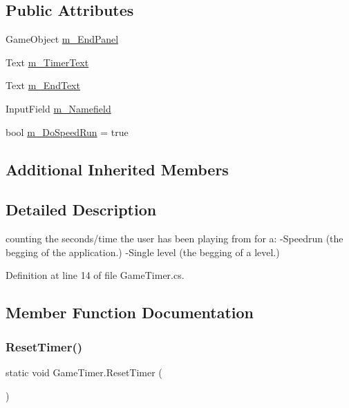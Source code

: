 \subsection*{Public Attributes}
\begin{DoxyCompactItemize}
\item 
Game\+Object \mbox{\hyperlink{class_game_timer_a637282ba9dad10e223642b69a8bc3704}{m\+\_\+\+End\+Panel}}
\item 
Text \mbox{\hyperlink{class_game_timer_a047f25d6ea0dbce86f59db934c7f4601}{m\+\_\+\+Timer\+Text}}
\item 
Text \mbox{\hyperlink{class_game_timer_a259af25e6db6814e21af2cf3c9e1ef8b}{m\+\_\+\+End\+Text}}
\item 
Input\+Field \mbox{\hyperlink{class_game_timer_a07186836d1ad021648e25653989741a1}{m\+\_\+\+Namefield}}
\item 
bool \mbox{\hyperlink{class_game_timer_a5570d9dfa184532926bb950503852d2d}{m\+\_\+\+Do\+Speed\+Run}} = true
\end{DoxyCompactItemize}
\subsection*{Additional Inherited Members}


\subsection{Detailed Description}
counting the seconds/time the user has been playing from for a\+: -\/\+Speedrun (the begging of the application.) -\/\+Single level (the begging of a level.) 



Definition at line 14 of file Game\+Timer.\+cs.



\subsection{Member Function Documentation}
\mbox{\label{class_game_timer_aaf5a277562bd3b15d7db641f14421329}} 
\subsubsection{\texorpdfstring{Reset\+Timer()}{ResetTimer()}}
{\footnotesize\ttfamily static void Game\+Timer.\+Reset\+Timer (\begin{DoxyParamCaption}{ }\end{DoxyParamCaption})\hspace{0.3cm}{\ttfamily [static]}}



